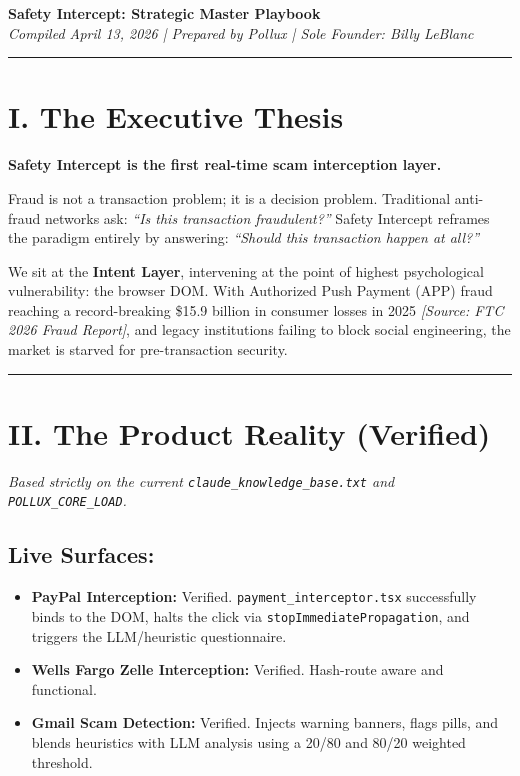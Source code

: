 \documentclass[11pt, letterpaper]{article}
\begin{document}
\begin{center}
{\LARGE \textbf{Safety Intercept: Strategic Master Playbook}}\\[12pt]
{\large \textit{Compiled April 13, 2026 | Prepared by Pollux | Sole Founder: Billy LeBlanc}}
\end{center}

\vspace{12pt}
\hrule
\vspace{12pt}

\section*{I. The Executive Thesis}

\textbf{Safety Intercept is the first real-time scam interception layer.}

Fraud is not a transaction problem; it is a decision problem. Traditional anti-fraud networks ask: \textit{``Is this transaction fraudulent?''} Safety Intercept reframes the paradigm entirely by answering: \textit{``Should this transaction happen at all?''}

We sit at the \textbf{Intent Layer}, intervening at the point of highest psychological vulnerability: the browser DOM. With Authorized Push Payment (APP) fraud reaching a record-breaking \$15.9 billion in consumer losses in 2025 \textit{[Source: FTC 2026 Fraud Report]}, and legacy institutions failing to block social engineering, the market is starved for pre-transaction security.

\vspace{12pt}
\hrule
\vspace{12pt}

\section*{II. The Product Reality (Verified)}

\textit{Based strictly on the current \texttt{claude\_knowledge\_base.txt} and \texttt{POLLUX\_CORE\_LOAD}.}

\subsection*{Live Surfaces:}
\begin{itemize}
    \item \textbf{PayPal Interception:} Verified. \texttt{payment\_interceptor.tsx} successfully binds to the DOM, halts the click via \texttt{stopImmediatePropagation}, and triggers the LLM/heuristic questionnaire. 
    \item \textbf{Wells Fargo Zelle Interception:} Verified. Hash-route aware and functional.
    \item \textbf{Gmail Scam Detection:} Verified. Injects warning banners, flags pills, and blends heuristics with LLM analysis using a 20/80 and 80/20 weighted threshold.
\end{itemize}
\end{document}
